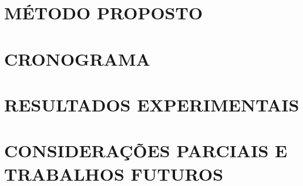 \documentclass[
	12pt,				%
    oneside,
	a4paper,			%
	chapter=TITLE,		%
	english,			%
	brazil				%
	]{abntex2}
\begin{document}
\chapter{MÉTODO PROPOSTO}
\label{chapter:metodo}


\chapter{CRONOGRAMA}
\label{chapter:cronograma}
%

\chapter{RESULTADOS EXPERIMENTAIS}
\label{chapter:resultados}
%

\chapter{CONSIDERAÇÕES PARCIAIS E TRABALHOS FUTUROS}
\label{chapter:conclusao}
%


\printindex
\end{document}
